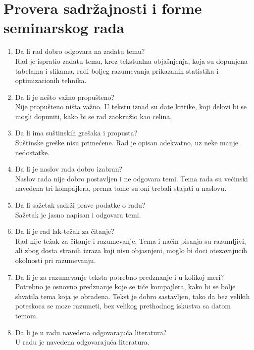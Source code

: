 \documentclass[a4paper]{report}
\begin{document}
\section{Provera sadržajnosti i forme seminarskog rada}

\begin{enumerate}
\item Da li rad dobro odgovara na zadatu temu?\\
Rad je ispratio zadatu temu, kroz tekstualna objašnjenja, koja su dopunjena tabelama i slikama, radi boljeg razumevanja prikazanih statistika i optimizacionih tehnika.

\item Da li je nešto važno propušteno?\\
Nije propušteno ništa važno. U tekstu iznad su date kritike, koji delovi bi se mogli dopuniti, kako bi se rad zaokružio kao celina.

\item Da li ima suštinskih grešaka i propusta?\\
Suštinske greške nisu primećene. Rad je opisan adekvatno, uz neke manje nedostatke.

\item Da li je naslov rada dobro izabran?\\
Naslov rada nije dobro postavljen i ne odgovara temi. Tema rada su većinski navedena tri kompajlera, prema tome su oni trebali stajati u naslovu.

\item Da li sažetak sadrži prave podatke o radu?\\
Sažetak je jasno napisan i odgovara temi.

\item Da li je rad lak-težak za čitanje?\\
Rad nije težak za čitanje i razumevanje. Tema i način pisanja su razumljivi, ali zbog dosta stranih izraza koji nisu objasnjeni, moglo bi doci otezavajucih okolnosti pri razumevanju.

\item Da li je za razumevanje teksta potrebno predznanje i u kolikoj meri?\\
Potrebno je osnovno predznanje koje se tiče kompajlera, kako bi se bolje shvatila tema koja je obradena. Tekst je dobro sastavljen, tako da bez velikih poteskoca se moze razumeti, bez velikog prethodnog iskustva sa datom temom.

\item Da li je u radu navedena odgovarajuća literatura?\\
U radu je navedena odgovarajuća literatura.


\end{enumerate}
\end{document}
